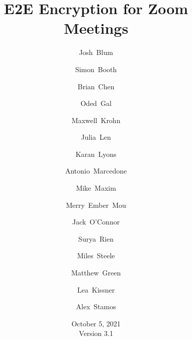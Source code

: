 \documentclass[11pt]{article}
\title{E2E Encryption for Zoom Meetings}
\author[1]{\small Josh~Blum}
\author[1]{\small Simon~Booth}
\author[1]{\small Brian~Chen}
\author[1]{\small Oded~Gal}
\author[1]{\small Maxwell~Krohn}
\author[1]{\small Julia~Len}
\author[1]{\small Karan~Lyons}
\author[1]{\small Antonio~Marcedone}
\author[1]{\small Mike~Maxim}
\author[1]{\small Merry~Ember~Mou}
\author[1]{\small Jack~O'Connor}
\author[1]{\small Surya~Rien}
\author[1]{\small Miles~Steele}
\author[2]{\small Matthew~Green}
\author[  \hspace{-1ex}]{\small Lea~Kissner}
\author[3]{\small Alex~Stamos}
\affil[1]{\footnotesize Zoom~Video~Communications}
\affil[2]{\footnotesize Johns~Hopkins~University}
\affil[3]{\footnotesize Stanford~University}
\date{October 5, 2021 \\ \small Version 3.1}
\begin{document}
    \null  %
    \nointerlineskip  %
    \vfill
    \let\snewpage \newpage
    \let\newpage \relax
    \maketitle
    \thispagestyle{titlepage}
    \let \newpage \snewpage
    \vfill 
    \break %

    \tableofcontents
    \newpage
    \renewcommand{\thesection}{\arabic{section}}
    \renewcommand{\thesubsection}{\thesection.\arabic{subsection}}
    
    
    
    
    
    
    
    
    \pagebreak
    
    \newpage
    \appendix
    
    
\end{document}
